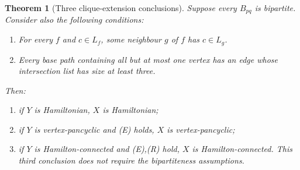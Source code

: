 \documentclass[11pt]{article}
\newtheorem{theorem}[lemma]{Theorem}
\begin{document}
\begin{theorem}[Three clique-extension conclusions]
Suppose every $B_{pq}$ is bipartite. Consider also the following conditions:
\begin{enumerate}
\item[(E)] For every $f$ and $c\in L_f$, some neighbour $g$ of $f$ has
$c\in L_g$.
\item[(R)] Every base path containing all but at most one vertex has an
edge whose intersection list has size at least three.
\end{enumerate}
Then:
\begin{enumerate}
\item if $Y$ is Hamiltonian, $X$ is Hamiltonian;
\item if $Y$ is vertex-pancyclic and (E) holds, $X$ is vertex-pancyclic;
\item if $Y$ is Hamilton-connected and (E),(R) hold, $X$ is
Hamilton-connected. This third conclusion does not require the
bipartiteness assumptions.
\end{enumerate}
\end{theorem}
\end{document}
